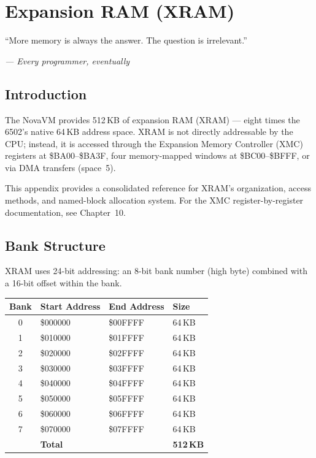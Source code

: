 \chapter{Expansion RAM (XRAM)}

\epigraph{``More memory is always the answer.  The question is
irrelevant.''}{\textit{--- Every programmer, eventually}}

\section*{Introduction}

The NovaVM provides 512\,KB of expansion RAM (XRAM) --- eight times the 6502's
native 64\,KB address space.  XRAM is not directly addressable by the CPU;
instead, it is accessed through the Expansion Memory Controller (XMC) registers
at \$BA00--\$BA3F, four memory-mapped windows at \$BC00--\$BFFF, or via DMA
transfers (space~5).

This appendix provides a consolidated reference for XRAM's organization, access
methods, and named-block allocation system.  For the XMC register-by-register
documentation, see Chapter~10.


\section{Bank Structure}
\label{sec:xram-banks}

XRAM uses 24-bit addressing: an 8-bit bank number (high byte) combined with a
16-bit offset within the bank.

\begin{center}
\small
\begin{tabular}{@{}clll@{}}
\toprule
\textbf{Bank} & \textbf{Start Address} & \textbf{End Address} & \textbf{Size} \\
\midrule
0 & \$000000 & \$00FFFF & 64\,KB \\
1 & \$010000 & \$01FFFF & 64\,KB \\
2 & \$020000 & \$02FFFF & 64\,KB \\
3 & \$030000 & \$03FFFF & 64\,KB \\
4 & \$040000 & \$04FFFF & 64\,KB \\
5 & \$050000 & \$05FFFF & 64\,KB \\
6 & \$060000 & \$06FFFF & 64\,KB \\
7 & \$070000 & \$07FFFF & 64\,KB \\
\midrule
  & \multicolumn{2}{l}{\textbf{Total}} & \textbf{512\,KB} \\
\bottomrule
\end{tabular}
\end{center}

